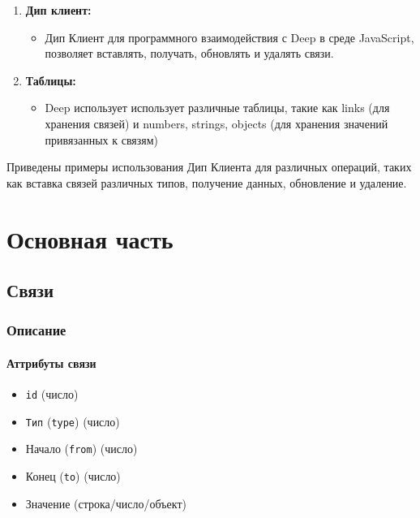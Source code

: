 \documentclass{article}
\begin{document}
\begin{enumerate}
  \item \textbf{Дип клиент:}
        \begin{itemize}
          \item Дип Клиент для программного взаимодействия с Deep в
                среде
                JavaScript, позволяет вставлять, получать, обновлять и
                удалять
                связи.
        \end{itemize}

  \item \textbf{Таблицы:}
        \begin{itemize}
          \item Deep использует использует различные таблицы, такие как
                links
                (для хранения связей) и numbers, strings, objects (для
                хранения
                значений
                привязанных к связям)
        \end{itemize}
\end{enumerate}

Приведены примеры использования Дип Клиента для различных операций, таких как
вставка связей различных типов, получение данных, обновление и удаление.


\tableofcontents

\section{Основная часть}

\subsection{Связи}

\subsubsection{Описание}

\paragraph{Аттрибуты связи}

\begin{itemize}
  \item \texttt{id} (число)
  \item \texttt{Тип} (\texttt{type}) (число)
  \item Начало (\texttt{from}) (число)
  \item Конец (\texttt{to}) (число)
  \item Значение (строка/число/объект)
\end{itemize}
\end{document}
